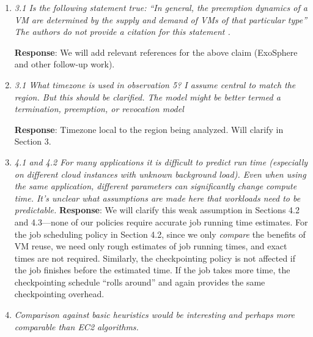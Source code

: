 \documentclass{article}
\newcommand{\resp}[1]{\textbf{Response}: #1}
\newcommand{\revmade}[1]{\textbf{Revision Made}: #1}
\begin{document}
\begin{enumerate}


\item \emph{3.1 Is the following statement true: “In general, the preemption dynamics of a VM are determined by the supply and demand of VMs of that particular type” The authors do not provide a citation for this statement .}

\resp{We will add relevant references for the above claim (ExoSphere and other follow-up work).}


\item \emph{3.1 What timezone is used in observation 5? I assume central to match the region. But this should be clarified.
The model might be better termed a termination, preemption, or revocation model}

\resp{Timezone local to the region being analyzed. Will clarify in Section 3.}





\item \emph{4.1 and 4.2 For many applications it is difficult to predict run time (especially on different cloud instances with unknown background load). Even when using the same application, different parameters can significantly change compute time. It's unclear what assumptions are made here that workloads need to be predictable.
  }
  \resp{We will clarify this weak assumption in Sections 4.2 and 4.3---none of our policies require accurate job running time estimates. 
    For the job scheduling policy in Section 4.2, since we only \emph{compare} the benefits of VM reuse, we need only rough estimates of job running times, and exact times are not required. 
    Similarly, the checkpointing policy is not affected  if the job finishes before the estimated time. If the job takes more time, the checkpointing schedule ``rolls around'' and again provides the same checkpointing overhead.
  }


\item \emph{Comparison against basic heuristics would be interesting and perhaps more comparable than EC2 algorithms.}


\end{enumerate}
\end{document}
